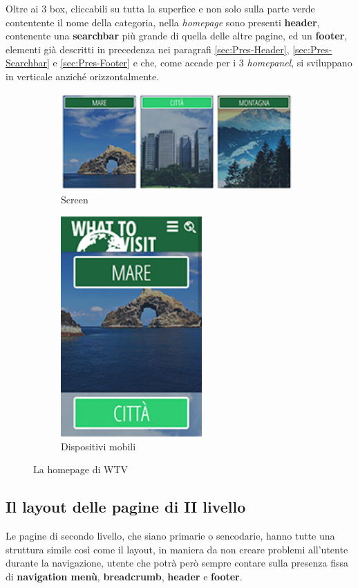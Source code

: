 Oltre ai 3 box, cliccabili su tutta la superfice e non solo sulla parte verde
contentente il nome della categoria, nella \textit{homepage} sono presenti
\textbf{header}, contenente una \textbf{searchbar} più grande di quella delle
altre pagine, ed un \textbf{footer}, elementi già descritti in precedenza nei
paragrafi \ref{sec:Pres-Header}, \ref{sec:Pres-Searchbar} e
\ref{sec:Pres-Footer} e che, come accade per i 3 \textit{homepanel}, si
sviluppano in verticale anziché orizzontalmente.
\begin{figure}[h!]
        \centering
        \begin{subfigure}[b]{0.3\textwidth}
                \includegraphics[height=3.7cm,width=8.9cm]{images/pres_home.jpg}
                \caption{Screen}
                \label{fig:Home-screen}
        \end{subfigure}
        \hspace{5cm}
        \begin{subfigure}[b]{0.3\textwidth}
                \includegraphics[height=8.43cm,width=5.4cm]{images/pres_home_m.jpg}
                \caption{Dispositivi mobili}
                \label{fig:Home-mobile}
        \end{subfigure}
        \caption{La homepage di WTV}\label{fig:Display-Home}
\end{figure}

\subsection{Il layout delle pagine di II livello}\label{sec:Pres-IIliv}
Le pagine di secondo livello, che siano primarie o sencodarie, hanno tutte una
struttura simile così come il layout, in maniera da non creare problemi
all'utente durante la navigazione, utente che potrà però sempre contare sulla
presenza fissa di \textbf{navigation menù}, \textbf{breadcrumb},
\textbf{header} e \textbf{footer}.

